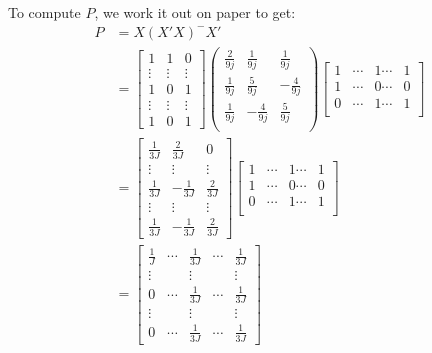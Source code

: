 \documentclass{article}
\begin{document}
To compute \(P\), we work it out on paper to get:
\begin{align*}
P &= X(X'X)^{-}X' \\
&=
\begin{bmatrix}
1&1&0\\
\vdots & \vdots& \vdots \\
1 & 0& 1 \\
\vdots & \vdots& \vdots\\
1& 0 & 1 
\end{bmatrix}
\left(
\begin{array}{ccc}
 \frac{2}{9 j} & \frac{1}{9 j} & \frac{1}{9 j} \\
 \frac{1}{9 j} & \frac{5}{9 j} & -\frac{4}{9 j} \\
 \frac{1}{9 j} & -\frac{4}{9 j} & \frac{5}{9 j} \\
\end{array}
\right)
\begin{bmatrix}
1&\cdots &1\cdots&1\\
1&\cdots & 0 \cdots &0\\
0&\cdots & 1\cdots &1\\
\end{bmatrix}\\
&=
\begin{bmatrix}
\frac{1}{3J}&\frac2{3J}&0\\
\vdots & \vdots& \vdots \\
\frac{1}{3J} & -\frac{1}{3J}& \frac{2}{3J}\\
\vdots & \vdots& \vdots\\
\frac{1}{3J}& -\frac{1}{3J} & \frac{2}{3J}
\end{bmatrix}
\begin{bmatrix}
1&\cdots &1\cdots&1\\
1&\cdots & 0 \cdots &0\\
0&\cdots & 1\cdots &1\\
\end{bmatrix}\\
&= \begin{bmatrix}
\frac1J & \cdots & \frac1{3J} & \cdots & \frac1{3J} \\
\vdots&&\vdots&&\vdots\\
0  & \cdots & \frac{1}{3J} &\cdots & \frac1{3J}\\
\vdots&&\vdots&&\vdots\\
0  & \cdots & \frac{1}{3J} &\cdots & \frac1{3J}
\end{bmatrix}
\end{align*}
\end{document}
